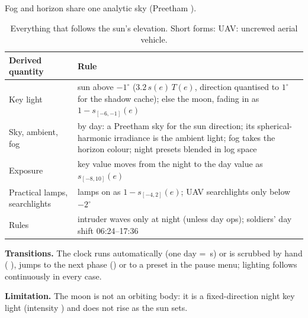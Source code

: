 Fog and horizon share one analytic sky (Preetham \cite{preetham1999}).

\begin{table}[htbp]
\caption{Everything that follows the sun's elevation. Short forms: UAV: uncrewed aerial vehicle.}
\centering\small
\begin{tabularx}{\linewidth}{@{}lX@{}}
\toprule
Derived quantity & Rule\\\midrule
Key light & sun above $-1^\circ$ ($3.2\,s(e)\,T(e)$, direction quantised to $1^\circ$ for the shadow cache); else the moon, fading in as $1-s_{[-6,-1]}(e)$\\
Sky, ambient, fog & by day: a Preetham sky for the sun direction; its spherical-harmonic irradiance is the ambient light; fog takes the horizon colour; night presets blended in log space\\
Exposure & key value moves from the night to the day value as $s_{[-8,10]}(e)$\\
Practical lamps, searchlights & lamps on as $1-s_{[-4,2]}(e)$; UAV searchlights only below $-2^\circ$\\
Rules & intruder waves only at night (unless day ops); soldiers' day shift 06:24--17:36\\
\bottomrule
\end{tabularx}
\end{table}

\textbf{Transitions.} The clock runs automatically (one day = \daySeconds\,s) or is scrubbed by hand (\key{,} ),
jumps to the next phase (\key{/}) or to a preset in the pause menu; lighting follows continuously in every case.

\textbf{Limitation.} The moon is not an orbiting body: it is a fixed-direction night key light (intensity \moonI) and
does not rise as the sun sets.
